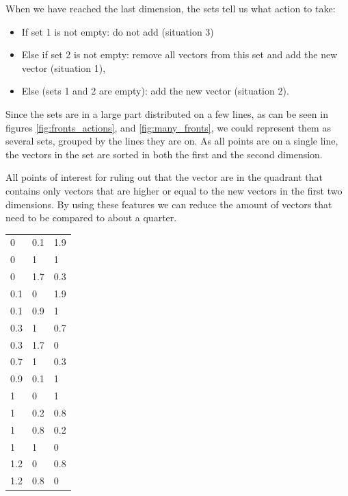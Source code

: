 \documentclass{article}
\makeatletter
\newenvironment{tablehere}
{\def\@captype{table}}
{}
\makeatother
\begin{document}
\begin{multicols}{2}
		When we have reached the last dimension, the sets tell us what action to
		take:
		\begin{itemize}
			\item If set 1 is not empty: do not add (situation 3)
			\item Else if set 2 is not empty: remove all vectors from this set and
				add the new vector (situation 1),
			\item Else (sets 1 and 2 are empty): add the new vector (situation 2).
		\end{itemize}

		Since the sets are in a large part distributed on a few lines, as can be
		seen in figures \ref{fig:fronts_actions}, and \ref{fig:many_fronts}, we
		could represent them as several sets, grouped by the lines they are on.
		As all points are on a single line, the vectors in the set are sorted in
		both the first and the second dimension.

		All points of interest for ruling out that the vector are in the quadrant
		that contains only vectors that are higher or equal to the new vectors in
		the first two dimensions. By using these features we can reduce the
		amount of vectors that need to be compared to about a quarter.

	\vspace{0.5cm}
	\begin{tablehere}
		\centering
		\begin{tabular}{|lll|}
		\hline
		0		&	0.1	&	1.9\\
		0		&	1		&	1\\
		0		&	1.7	&	0.3\\
		\hline
		0.1	&	0		&	1.9\\
		0.1	&	0.9	&	1\\
		\hline
		0.3	&	1		&	0.7\\
		0.3	&	1.7	&	0\\
		\hline
		0.7	&	1		&	0.3\\
		\hline
		0.9	&	0.1	&	1\\
		\hline
		1		&	0		&	1\\
		1		&	0.2	&	0.8\\
		1		&	0.8	&	0.2\\
		1		&	1		&	0\\
		\hline
		1.2	&	0		&	0.8\\
		1.2	&	0.8	&	0\\
		\hline
		\end{tabular}
		\label{tab:t2_138}
	\end{tablehere}


\end{multicols}
\end{document}
